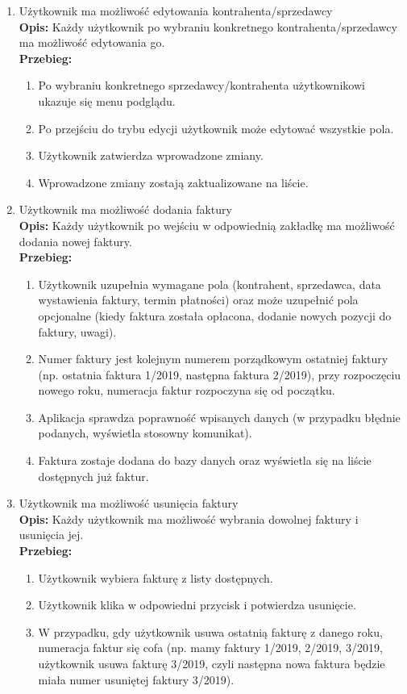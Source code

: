 \begin{enumerate}
    \item Użytkownik ma możliwość edytowania kontrahenta/sprzedawcy\\
    \textbf{Opis: } Każdy użytkownik po wybraniu konkretnego kontrahenta/sprzedawcy ma możliwość edytowania go.\\
    \textbf{Przebieg: }
    \begin{enumerate}
        \item Po wybraniu konkretnego sprzedawcy/kontrahenta użytkownikowi ukazuje się menu podglądu.
        \item Po przejściu do trybu edycji użytkownik może edytować wszystkie pola.
        \item Użytkownik zatwierdza wprowadzone zmiany.
        \item Wprowadzone zmiany zostają zaktualizowane na liście.\\
    \end{enumerate}
    
    \item Użytkownik ma możliwość dodania faktury \\
    \textbf{Opis: } Każdy użytkownik po wejściu w odpowiednią zakładkę ma możliwość dodania nowej faktury.\\
    \textbf{Przebieg: }
    \begin{enumerate}
        \item Użytkownik uzupełnia wymagane pola (kontrahent, sprzedawca, data wystawienia faktury, termin płatności) oraz może uzupełnić pola opcjonalne (kiedy faktura została opłacona, dodanie nowych pozycji do faktury, uwagi).
        \item Numer faktury jest kolejnym numerem porządkowym ostatniej faktury (np. ostatnia faktura 1/2019, następna faktura 2/2019), przy rozpoczęciu nowego roku, numeracja faktur rozpoczyna się od początku.
        \item Aplikacja sprawdza poprawność wpisanych danych (w przypadku błędnie podanych, wyświetla stosowny komunikat).
        \item Faktura zostaje dodana do bazy danych oraz wyświetla się na liście dostępnych już faktur.\\
    \end{enumerate}
    
    \item Użytkownik ma możliwość usunięcia faktury\\
    \textbf{Opis: } Każdy użytkownik ma możliwość wybrania dowolnej faktury i usunięcia jej.\\
    \textbf{Przebieg: } 
    \begin{enumerate}
        \item Użytkownik wybiera fakturę z listy dostępnych.
        \item Użytkownik klika w odpowiedni przycisk i potwierdza usunięcie.
        \item W przypadku, gdy użytkownik usuwa ostatnią fakturę z danego roku, numeracja faktur się cofa (np. mamy faktury 1/2019, 2/2019, 3/2019, użytkownik usuwa fakturę 3/2019, czyli następna nowa faktura będzie miała numer usuniętej faktury 3/2019).\\
    \end{enumerate}
    

\end{enumerate}
